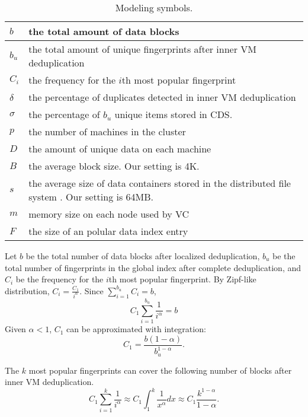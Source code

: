 \begin{table}[ht]
\centering
\begin{tabular}{|p{1.25cm}|p{6.5cm}|}
\hline
$b$ &  the total amount of data blocks\\ 
\hline
$b_u$ &  the total amount of unique fingerprints after inner VM  deduplication\\
\hline
$C_i$ &  the frequency for the $i$th most popular fingerprint\\
\hline
$\delta$ &  the percentage of duplicates detected in inner VM deduplication\\
\hline
$\sigma$ &  the percentage of $b_u$ unique items  stored in CDS.\\
\hline
$p$ & the number of machines in the cluster\\
\hline
$D$ & the amount of unique data on each machine\\
\hline
$B$ & the average block size. Our setting is  4K.\\
\hline
$s$ & the average size of data containers stored in the distributed file system . Our setting is  64MB.\\
\hline
$m$ & memory size on each node used by VC\\ 
\hline
$F$ & the size of an polular data index entry\\
\hline
\end{tabular}
\caption{Modeling  symbols.}
\label{tab:symbol}
\end{table}


Let $b$ be the total number of data blocks after localized deduplication, 
$b_u$ be the total number of fingerprints 
in the global index after complete deduplication, and
$C_i$ be the frequency for the $i$th most popular fingerprint. 
By Zipf-like distribution, $C_i = \frac{C_1}{i^\alpha}.$
Since $ \sum_{i=1}^{b_u}C_i = b$,
\[
C_1 \sum_{i=1}^{b_u}\frac{1}{i^\alpha} = b
\]
Given $\alpha <1$, $C_1$ can be approximated with integration:
\begin{equation}
C_1=\frac{b(1-\alpha)}{b_u^{1-\alpha}}.
\end{equation}


The  $k$ most popular fingerprints can cover the following number of blocks after inner VM 
deduplication.
\[
C_1 \sum_{i=1}^{k}\frac{1}{i^\alpha} \approx  
C_1 \int_{1}^{k}\frac{1}{x^\alpha} dx  \approx  C_1\frac{  k^{1-\alpha}} {1-\alpha}.
\]

